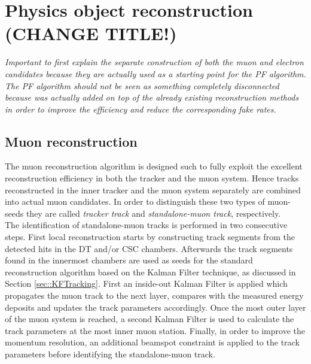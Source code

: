 \section{Physics object reconstruction (CHANGE TITLE!)} \label{sec::PhysicsObjects}

\textit{Important to first explain the separate construction of both the muon and electron candidates because they are actually used as a starting point for the PF algorithm. The PF algorithm should not be seen as something completely disconnected because was actually added on top of the already existing reconstruction methods in order to improve the efficiency and reduce the corresponding fake rates.}

\subsection{Muon reconstruction}\label{subsec::Muon}

The muon reconstruction algorithm is designed such to fully exploit the excellent reconstruction efficiency in both the tracker and the muon system.
Hence tracks reconstructed in the inner tracker and the muon system separately are combined into actual muon candidates. In order to distinguish these two types of muon-seeds they are called \textit{tracker track} and \textit{standalone-muon track}, respectively.
\\
The identification of standalone-muon tracks is performed in two consecutive steps. First local reconstruction starts by constructing track segments from the detected hits in the DT and/or CSC chambers. Afterwards the track segments found in the innermost chambers are used as seeds for the standard reconstruction algorithm based on the Kalman Filter technique, as discussed in Section \ref{sec::KFTracking}. First an inside-out Kalman Filter is applied which propagates the muon track to the next layer, compares with the measured energy deposits and updates the track parameters accordingly. Once the most outer layer of the muon system is reached, a second Kalman Filter is used to calculate the track parameters at the most inner muon station. Finally, in order to improve the momentum resolution, an additional beamspot constraint is applied to the track parameters before identifying the standalone-muon track.

